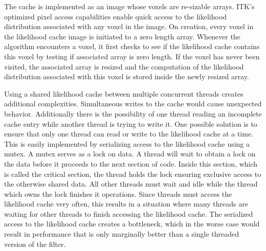 The cache is implemented as an image whose voxels are re-sizable arrays.  ITK's optimized pixel access capabilities enable quick access to the likelihood distribution associated with any voxel in the image.  On creation, every voxel in the likelihood cache image is initiated to a zero length array.  Whenever the algorithm encounters a voxel, it first checks to see if the likelihood cache contains this voxel by testing if associated array is zero length.  If the voxel has never been visited, the associated array is resized and the computation of the likelihood distribution associated with this voxel is stored inside the newly resized array.

Using a shared likelihood cache between multiple concurrent threads creates additional complexities.  Simultaneous writes to the cache would cause unexpected behavior.  Additionally there is the possibility of one thread reading an incomplete cache entry while another thread is trying to write it.  One possible solution is to ensure that only one thread can read or write to the likelihood cache at a time.  This is easily implemented by serializing access to the likelihood cache using a mutex.  A mutex serves as a lock on data.  A thread will wait to obtain a lock on the data before it proceeds to the next section of code.  Inside this section, which is called the critical section, the thread holds the lock ensuring exclusive access to the otherwise shared data.  All other threads must wait and idle while the thread which owns the lock finishes it operations.  Since threads must access the likelihood cache very often, this results in a situation where many threads are waiting for other threads to finish accessing the likelihood cache.  The serialized access to the likelihood cache creates a bottleneck, which in the worse case would result in performance that is only marginally better than a single threaded version of the filter.
